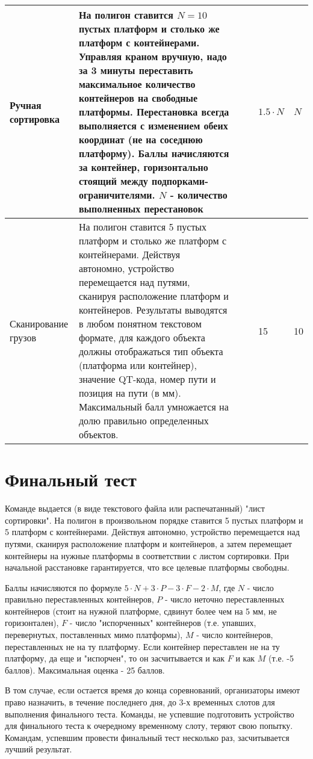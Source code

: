 \begin{center}
\begin{longtable}{|p{2.8cm}|p{6.2cm}|p{1.1cm}|p{1.1cm}|p{1.1cm}|p{1.1cm}|}
        \hline
        Ручная сортировка & На полигон ставится $N=10$ пустых платформ и столько же платформ с контейнерами. Управляя краном вручную, надо за 3 минуты переставить максимальное количество контейнеров на свободные платформы. Перестановка всегда выполняется с изменением обеих координат (не на соседнюю платформу).  Баллы начисляются за контейнер, горизонтально стоящий между подпорками-ограничителями.  $N$ - количество выполненных перестановок & & & $1.5 \cdot N$ & $N$ \\
        \hline
        Сканирование грузов & На полигон ставится 5 пустых платформ и столько же платформ с контейнерами. Действуя автономно, устройство перемещается над путями, сканируя расположение платформ и контейнеров.  Результаты выводятся в любом понятном текстовом формате, для каждого объекта должны отображаться тип объекта (платформа или контейнер), значение QT-кода, номер пути и позиция на пути (в мм). Максимальный балл умножается на долю правильно определенных объектов. & & & 15 & 10 \\
        \hline
    \end{longtable}
\end{center}

\section{Финальный тест} 

Команде выдается (в виде текстового файла или распечатанный) "лист сортировки". На полигон в произвольном порядке ставится 5 пустых платформ и 5 платформ с контейнерами. Действуя автономно, устройство перемещается над путями, сканируя расположение платформ и контейнеров, а затем перемещает контейнеры на нужные платформы в соответствии с листом сортировки. При начальной расстановке гарантируется, что все целевые платформы свободны.  

Баллы начисляются по формуле  $5 \cdot N + 3 \cdot P -3 \cdot F-2 \cdot M$,  где $N$ - число правильно переставленных контейнеров, $P$ - число неточно переставленных контейнеров (стоит на нужной платформе, сдвинут более чем на 5 мм, не горизонтален),  $F$ - число "испорченных" контейнеров (т.е. упавших, перевернутых, поставленных мимо платформы), $M$ - число контейнеров, переставленных не на ту платформу. Если контейнер переставлен не на ту платформу, да еще и "испорчен", то он засчитывается и как $F$ и как $M$  (т.е. -5 баллов).  Максимальная оценка - 25 баллов.

В том случае, если остается время до конца соревнований, организаторы имеют право назначить, в течение последнего дня, до 3-х временных слотов для выполнения финального теста. Команды, не успевшие подготовить устройство для финального теста к очередному временному слоту, теряют свою попытку. Командам, успевшим провести финальный тест несколько раз, засчитывается лучший результат.

